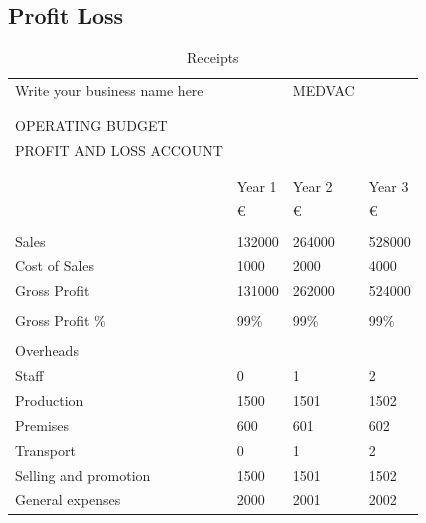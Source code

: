 \documentclass{article}
\begin{document}
\subsection{Profit Loss}
\begin{table}[H]
\centering
\caption{Receipts}
\label{my-label}
\begin{tabular}{llll}
Write your business name here &        & MEDVAC &        \\
                              &        &        &        \\
                              &        &        &        \\
OPERATING BUDGET              &        &        &        \\
PROFIT AND LOSS ACCOUNT       &        &        &        \\
                              &        &        &        \\
                              &        &        &        \\
                              & Year 1 & Year 2 & Year 3 \\
                              & €      & €      & €      \\
                              &        &        &        \\
Sales                         & 132000 & 264000 & 528000 \\
Cost of Sales                 & 1000   & 2000   & 4000   \\
Gross Profit                  & 131000 & 262000 & 524000 \\
                              &        &        &        \\
Gross Profit \%               & 99\%   & 99\%   & 99\%   \\
                              &        &        &        \\
Overheads                     &        &        &        \\
Staff                         & 0      & 1      & 2      \\
Production                    & 1500   & 1501   & 1502   \\
Premises                      & 600    & 601    & 602    \\
Transport                     & 0      & 1      & 2      \\
Selling and promotion         & 1500   & 1501   & 1502   \\
General expenses              & 2000   & 2001   & 2002   \\

\end{tabular}
\end{table}
\end{document}
